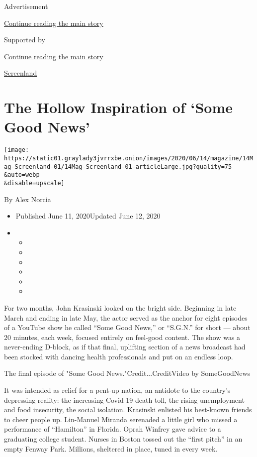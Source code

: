 Advertisement

\protect\hyperlink{after-top}{Continue reading the main story}

Supported by

\protect\hyperlink{after-sponsor}{Continue reading the main story}

\href{/column/screenland}{Screenland}

\hypertarget{the-hollow-inspiration-of-some-good-news}{%
\section{The Hollow Inspiration of `Some Good
News'}\label{the-hollow-inspiration-of-some-good-news}}

\texttt{[image: https://static01.graylady3jvrrxbe.onion/images/2020/06/14/magazine/14Mag-Screenland-01/14Mag-Screenland-01-articleLarge.jpg?quality=75\\\&auto=webp\\\&disable=upscale]}

By Alex Norcia

\begin{itemize}
\item
  Published June 11, 2020Updated June 12, 2020
\item
  \begin{itemize}
  \item
  \item
  \item
  \item
  \item
  \item
  \end{itemize}
\end{itemize}

For two months, John Krasinski looked on the bright side. Beginning in
late March and ending in late May, the actor served as the anchor for
eight episodes of a YouTube show he called ``Some Good News,'' or
``S.G.N.'' for short --- about 20 minutes, each week, focused entirely
on feel-good content. The show was a never-ending D-block, as if that
final, uplifting section of a news broadcast had been stocked with
dancing health professionals and put on an endless loop.

The final episode of "Some Good News."Credit...CreditVideo by
SomeGoodNews

It was intended as relief for a pent-up nation, an antidote to the
country's depressing reality: the increasing Covid-19 death toll, the
rising unemployment and food insecurity, the social isolation. Krasinski
enlisted his best-known friends to cheer people up. Lin-Manuel Miranda
serenaded a little girl who missed a performance of ``Hamilton'' in
Florida. Oprah Winfrey gave advice to a graduating college student.
Nurses in Boston tossed out the ``first pitch'' in an empty Fenway Park.
Millions, sheltered in place, tuned in every week.

